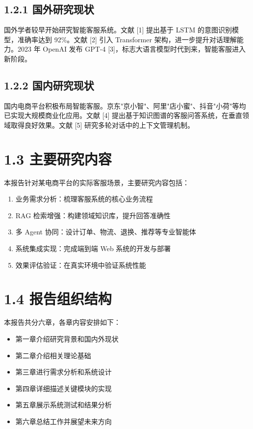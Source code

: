 \documentclass{harryopo-report}
\begin{document}
\subsection*{1.2.1 国外研究现状}

国外学者较早开始研究智能客服系统。文献 [1] 提出基于 LSTM 的意图识别模型，准确率达到 92\%。文献 [2] 引入 Transformer 架构，进一步提升对话理解能力。2023 年 OpenAI 发布 GPT-4 [3]，标志大语言模型时代到来，智能客服进入新阶段。

\subsection*{1.2.2 国内研究现状}

国内电商平台积极布局智能客服。京东"京小智"、阿里"店小蜜"、抖音"小荷"等均已实现大规模商业化应用。文献 [4] 提出基于知识图谱的客服问答系统，在垂直领域取得良好效果。文献 [5] 研究多轮对话中的上下文管理机制。

\section*{1.3 主要研究内容}

本报告针对某电商平台的实际客服场景，主要研究内容包括：

\begin{enumerate}
  \item {\fzht 业务需求分析}：梳理客服系统的核心业务流程
  \item {\fzht RAG 检索增强}：构建领域知识库，提升回答准确性
  \item {\fzht 多 Agent 协同}：设计订单、物流、退换、推荐等专业智能体
  \item {\fzht 系统集成实现}：完成端到端 Web 系统的开发与部署
  \item {\fzht 效果评估验证}：在真实环境中验证系统性能
\end{enumerate}

\section*{1.4 报告组织结构}

本报告共分六章，各章内容安排如下：

\begin{itemize}
  \item 第一章介绍研究背景和国内外现状
  \item 第二章介绍相关理论基础
  \item 第三章进行需求分析和系统设计
  \item 第四章详细描述关键模块的实现
  \item 第五章展示系统测试和结果分析
  \item 第六章总结工作并展望未来方向
\end{itemize}
\end{document}
